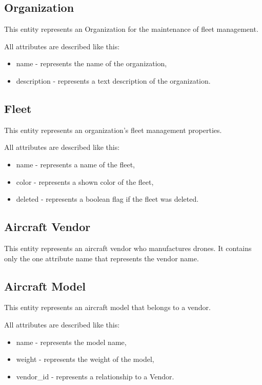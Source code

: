 \subsection{Organization}\label{subsec:organization}
This entity represents an Organization for the maintenance of fleet management.

All attributes are described like this:
\begin{itemize}
    \item name - represents the name of the organization,
    \item description - represents a text description of the organization.
\end{itemize}

\subsection{Fleet}\label{subsec:fleet}
This entity represents an organization's fleet management properties.

All attributes are described like this:
\begin{itemize}
    \item name - represents a name of the fleet,
    \item color - represents a shown color of the fleet,
    \item deleted - represents a boolean flag if the fleet was deleted.
\end{itemize}

\subsection{Aircraft Vendor}\label{subsec:aircraft-vendor}
This entity represents an aircraft vendor who manufactures drones.
It contains only the one attribute name that represents the vendor name.

\subsection{Aircraft Model}\label{subsec:aircraft-model}
This entity represents an aircraft model that belongs to a vendor.

All attributes are described like this:
\begin{itemize}
    \item name - represents the model name,
    \item weight - represents the weight of the model,
    \item vendor\_id - represents a relationship to a Vendor.
\end{itemize}

